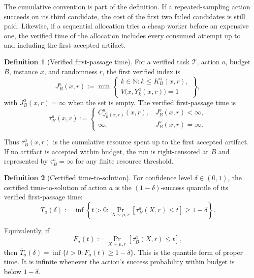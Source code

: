 \documentclass[10pt,twocolumn]{article}
\theoremstyle{definition}
\newtheorem{definition}{Definition}
\theoremstyle{plain}
\theoremstyle{remark}
\begin{document}
The cumulative convention is part of the definition.  If a repeated-sampling
action succeeds on its third candidate, the cost of the first two failed
candidates is still paid.  Likewise, if a sequential allocation tries a cheap
worker before an expensive one, the verified time of the allocation includes
every consumed attempt up to and including the first accepted artifact.

\begin{definition}[Verified first-passage time]
\label{def:first-passage}
For a verified task \(\mathcal T\), action \(a\), budget \(B\), instance \(x\),
and randomness \(r\), the first verified index is
\[
    J^a_B(x,r)
    :=
    \min\left\{
        \begin{array}{l}
        k\in\mathbb N:
        k\le K^a_B(x,r),\\
        V\bigl(x,Y^a_k(x,r)\bigr)=1
        \end{array}
    \right\},
\]
with \(J^a_B(x,r)=\infty\) when the set is empty.  The verified
first-passage time is
\[
    \tau^a_B(x,r)
    :=
    \begin{cases}
    C^a_{J^a_B(x,r)}(x,r), & J^a_B(x,r)<\infty,\\
    \infty, & J^a_B(x,r)=\infty.
    \end{cases}
\]
\end{definition}

Thus \(\tau^a_B(x,r)\) is the cumulative resource spent up to the first
accepted artifact.  If no artifact is accepted within budget, the run is
right-censored at \(B\) and represented by \(\tau^a_B=\infty\) for any finite
resource threshold.

\begin{definition}[Certified time-to-solution]
\label{def:certified-time}
For confidence level \(\delta\in(0,1)\), the certified time-to-solution of
action \(a\) is the \((1-\delta)\)-success quantile of its verified
first-passage time:
\[
    \overline T_a(\delta)
    :=
    \inf\left\{
        t>0:
        \Pr_{X\sim\mu,r}
        \left[
            \tau^a_B(X,r)\le t
        \right]
        \ge 1-\delta
    \right\}.
\]
\end{definition}

Equivalently, if
\[
    F_a(t):=\Pr_{X\sim\mu,r}\!\left[\tau^a_B(X,r)\le t\right],
\]
then \(\overline T_a(\delta)=\inf\{t>0:F_a(t)\ge 1-\delta\}\).  This is the
quantile form of proper time.  It is infinite whenever the action's success
probability within budget is below \(1-\delta\).
\end{document}
